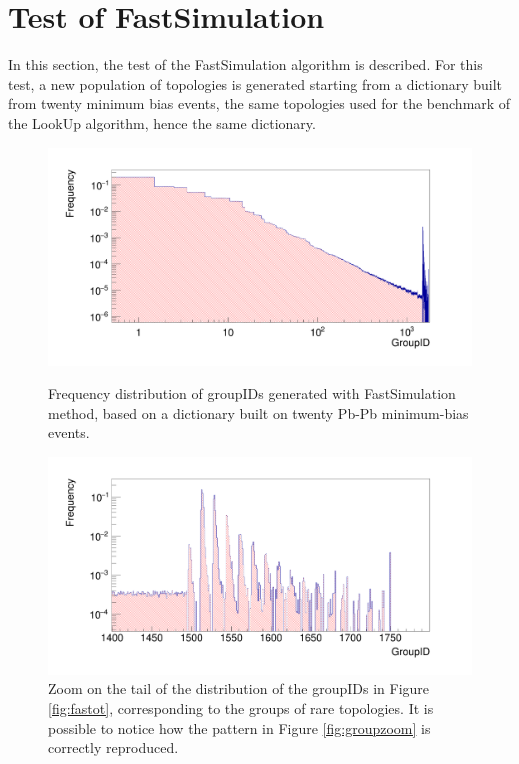 \section{Test of FastSimulation}
In this section, the test of the FastSimulation algorithm is described. For this test, a new population of topologies is generated starting from a dictionary built from twenty minimum bias events, the same topologies used for the benchmark of the LookUp algorithm, hence the same dictionary.\\
%
\begin{figure}
  \centering
  \includegraphics[scale=0.2]{figures/fastot.png}
  \caption{Frequency distribution of groupIDs generated with FastSimulation method, based on a dictionary built on twenty Pb-Pb minimum-bias events.}
  \label{fig:fastot}
  \centering
  \includegraphics[scale=0.2]{figures/fastzoom.png}
  \caption{Zoom on the tail of the distribution of the groupIDs in Figure \ref{fig:fastot}, corresponding to the groups of rare topologies. It is possible to notice how the pattern in Figure \ref{fig:groupzoom} is correctly reproduced.}
  \label{fig:fastzoom}
\end{figure}
%
